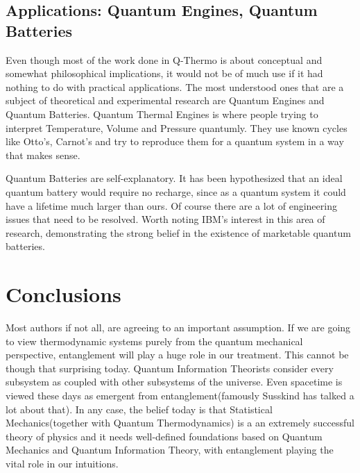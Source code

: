 \documentclass[a4paper,12pt]{article}
\begin{document}
\subsection*{Applications: Quantum Engines, Quantum Batteries}
Even though most of the work done in Q-Thermo is about conceptual and somewhat philosophical implications, it would not be of much use if it had nothing to do with practical applications. The most understood ones that are a subject of theoretical and experimental research are Quantum Engines and Quantum Batteries. Quantum Thermal Engines is where people trying to interpret Temperature, Volume and Pressure quantumly. They use known cycles like Otto's, Carnot's and try to reproduce them for a quantum system in a way that makes sense.\par Quantum Batteries are self-explanatory. It has been hypothesized that an ideal quantum battery would require no recharge, since as a quantum system it could have a lifetime much larger than ours. Of course there are a lot of engineering issues that need to be resolved. Worth noting IBM's interest in this area of research, demonstrating the strong belief in the existence of marketable quantum batteries.


\section{Conclusions}
Most authors if not all, are agreeing to an important assumption. If we are going to view thermodynamic systems purely  from the quantum mechanical perspective, entanglement will play a huge role in our treatment. This cannot be though that surprising today. Quantum Information Theorists consider every subsystem as coupled with other subsystems of the universe. Even spacetime is viewed these days as emergent from entanglement(famously Susskind has talked a lot about that).
In any case, the belief today is that Statistical Mechanics(together with Quantum Thermodynamics) is a an extremely successful theory of physics and it needs well-defined foundations based on Quantum Mechanics and Quantum Information Theory, with entanglement playing the vital role in our intuitions.





\end{document}
